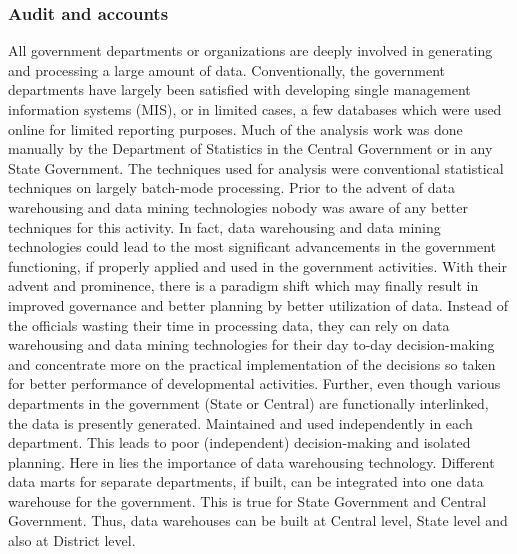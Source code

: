 \subsubsection*{Audit and accounts}
All government departments or organizations are deeply involved in
generating and processing a large amount of data. Conventionally, the
government departments have largely been satisfied with developing single
management information systems (MIS), or in limited cases, a few databases
which were used online for limited reporting purposes. Much of the analysis
work was done manually by the Department of Statistics in the Central
Government or in any State Government. The techniques used for analysis were
conventional statistical techniques on largely batch-mode processing. Prior to
the advent of data warehousing and data mining technologies nobody was
aware of any better techniques for this activity. In fact, data warehousing and
data mining technologies could lead to the most significant advancements in
the government functioning, if properly applied and used in the government
activities. With their advent and prominence, there is a paradigm shift which
may finally result in improved governance and better planning by better
utilization of data. Instead of the officials wasting their time in processing data,
they can rely on data warehousing and data mining technologies for their day
to-day decision-making and concentrate more on the practical implementation
of the decisions so taken for better performance of developmental activities.
Further, even though various departments in the government (State or
Central) are functionally interlinked, the data is presently generated. Maintained
and used independently in each department. This leads to poor (independent)
decision-making and isolated planning. Here in lies the importance of data
warehousing technology. Different data marts for separate departments, if built,
can be integrated into one data warehouse for the government. This is true for
State Government and Central Government. Thus, data warehouses can be built
at Central level, State level and also at District level.

\newpage\thispagestyle{empty}